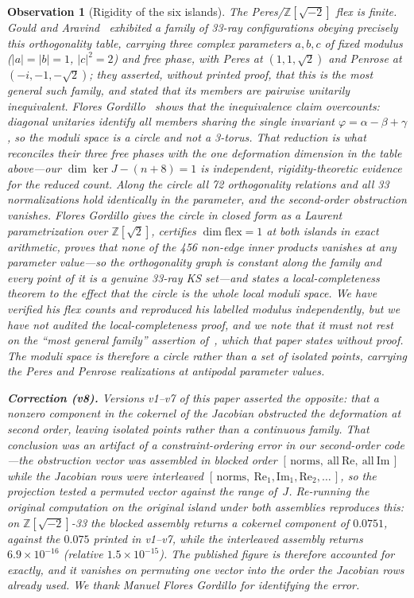 \documentclass[12pt,a4paper]{article}
\newtheorem{observation}[theorem]{Observation}
\newcommand{\Z}{\mathbb{Z}}
\begin{document}
\begin{observation}[Rigidity of the six islands]
The Peres/\mbox{$\Z[\sqrt{-2}]$} flex is \emph{finite}.  Gould and Aravind~\cite{GouldAravind2010} exhibited a family of 33-ray configurations obeying precisely this orthogonality table, carrying three complex parameters $a,b,c$ of fixed modulus ($|a| = |b| = 1$, $|c|^2 = 2$) and free phase, with Peres at $(1,1,\sqrt{2})$ and Penrose at $(-i,-1,-\sqrt{2})$; they asserted, without printed proof, that this is the most general such family, and stated that its members are pairwise unitarily inequivalent.  Flores Gordillo~\cite{FloresGordillo2026} shows that the inequivalence claim overcounts: diagonal unitaries identify all members sharing the single invariant $\varphi = \alpha - \beta + \gamma$, so the moduli space is a circle and not a 3-torus.  That reduction is what reconciles their three free phases with the one deformation dimension in the table above---our $\dim\ker J - (n{+}8) = 1$ is independent, rigidity-theoretic evidence for the reduced count.  Along the circle all 72 orthogonality relations and all 33 normalizations hold identically in the parameter, and the second-order obstruction vanishes.  Flores Gordillo gives the circle in closed form as a Laurent parametrization over $\Z[\sqrt{2}]$, certifies $\dim\mathrm{flex} = 1$ at both islands in exact arithmetic, proves that none of the 456 non-edge inner products vanishes at any parameter value---so the orthogonality graph is constant along the family and every point of it is a genuine 33-ray KS set---and states a local-completeness theorem to the effect that the circle is the whole local moduli space.  We have verified his flex counts and reproduced his labelled modulus independently, but we have not audited the local-completeness proof, and we note that it must not rest on the ``most general family'' assertion of~\cite{GouldAravind2010}, which that paper states without proof.  The moduli space is therefore a circle rather than a set of isolated points, carrying the Peres and Penrose realizations at antipodal parameter values.

\smallskip\noindent\textbf{Correction (v8).}  Versions v1--v7 of this paper asserted the opposite: that a nonzero component in the cokernel of the Jacobian obstructed the deformation at second order, leaving isolated points rather than a continuous family.  That conclusion was an artifact of a constraint-ordering error in our second-order code---the obstruction vector was assembled in blocked order $[\,\mathrm{norms},\ \mathrm{all\ Re},\ \mathrm{all\ Im}\,]$ while the Jacobian rows were interleaved $[\,\mathrm{norms},\ \mathrm{Re}_1, \mathrm{Im}_1, \mathrm{Re}_2, \ldots\,]$, so the projection tested a permuted vector against the range of~$J$.  Re-running the original computation on the original island under both assemblies reproduces this: on $\Z[\sqrt{-2}]$-33 the blocked assembly returns a cokernel component of $0.0751$, against the $0.075$ printed in v1--v7, while the interleaved assembly returns $6.9\times10^{-16}$ (relative $1.5\times10^{-15}$).  The published figure is therefore accounted for exactly, and it vanishes on permuting one vector into the order the Jacobian rows already used.  We thank Manuel Flores Gordillo for identifying the error.
\end{observation}
\end{document}
